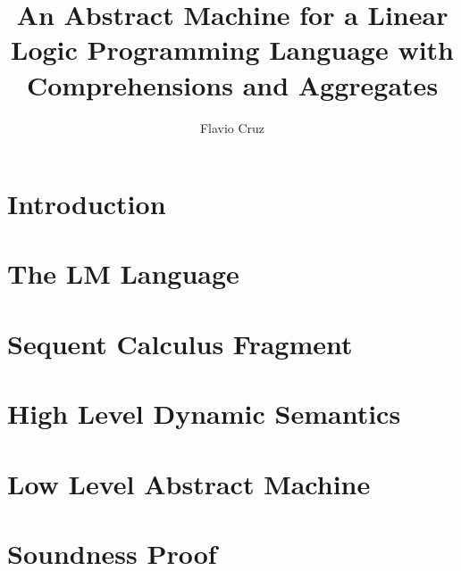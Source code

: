 \documentclass{llncs}
\begin{document}
\newcommand{\cmu}{\ensuremath{^\dag}}
\newcommand{\fcup}{\ensuremath{^\ddag}}

\title{An Abstract Machine for a Linear Logic Programming Language with
Comprehensions and Aggregates}
\author{Flavio Cruz}



\maketitle
\begin{abstract}

\end{abstract}
\pagestyle{headings}  %

\section{Introduction}


\section{The LM Language}


\section{Sequent Calculus Fragment}


\section{High Level Dynamic Semantics}


\section{Low Level Abstract Machine}


\section{Soundness Proof}\label{sec:soundness}

\end{document}
